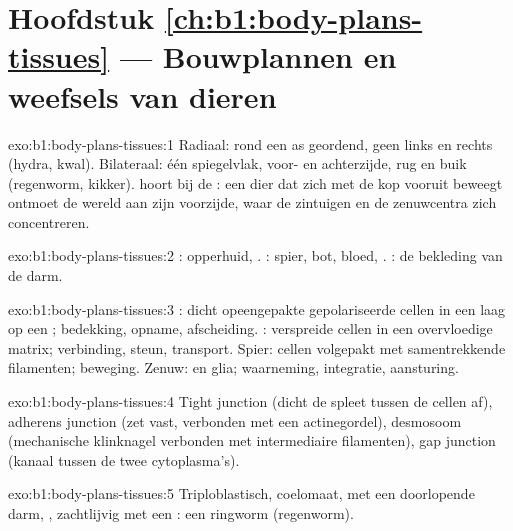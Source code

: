 \section*{Hoofdstuk \ref{ch:b1:body-plans-tissues} --- Bouwplannen en weefsels van dieren}

\begin{solution}{exo:b1:body-plans-tissues:1}
Radiaal: rond een as geordend, geen links en rechts (hydra, kwal). Bilateraal:
één spiegelvlak, voor- en achterzijde, rug en buik (regenworm, kikker).
 hoort bij de : een dier dat zich met de kop
vooruit beweegt ontmoet de wereld aan zijn voorzijde, waar de zintuigen en de
zenuwcentra zich concentreren.
\end{solution}

\begin{solution}{exo:b1:body-plans-tissues:2}
: opperhuid, . : spier, bot, bloed, .
: de bekleding van de darm.
\end{solution}

\begin{solution}{exo:b1:body-plans-tissues:3}
: dicht opeengepakte gepolariseerde cellen in een laag op een ; bedekking, opname, afscheiding. : verspreide cellen in een
overvloedige matrix; verbinding, steun, transport. Spier: cellen volgepakt met
samentrekkende filamenten; beweging. Zenuw:  en glia; waarneming,
integratie, aansturing.
\end{solution}

\begin{solution}{exo:b1:body-plans-tissues:4}
Tight junction (dicht de spleet tussen de cellen af), adherens junction (zet
vast, verbonden met een actinegordel), desmosoom (mechanische klinknagel
verbonden met intermediaire filamenten), gap junction (kanaal tussen de twee
cytoplasma's).
\end{solution}

\begin{solution}{exo:b1:body-plans-tissues:5}
Triploblastisch, coelomaat, met een doorlopende darm, , zachtlijvig
met een : een ringworm (regenworm).
\end{solution}

